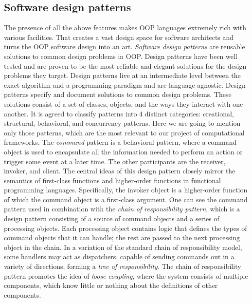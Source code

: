 \subsection{Software design patterns}
\label{background_design}
\quad The presence of all the above features makes OOP languages extremely rich with various facilities. That creates a vast design space for software architects and turns the OOP software design into an art. \textit{Software design patterns} \cite{gang-of-four} are reusable solutions to common design problems in OOP. Design patterns have been well tested and are proven to be the most reliable and elegant solutions for the design problems they target.\newline\null
\quad Design patterns live at an intermediate level between the exact algorithm and a programming paradigm and are language agnostic. Design patterns specify and document solutions to common design problems. These solutions consist of a set of classes, objects, and the ways they interact with one another. It is agreed to classify patterns into 4 distinct categories: creational, structural, behavioral, and concurrency patterns. Here we are going to mention only those patterns, which are the most relevant to our project of computational frameworks.\newline\null
\quad The \textit{command} pattern is a behavioral pattern, where a command object is used to encapsulate all the information needed to perform an action or trigger some event at a later time. The other participants are the receiver, invoker, and client. The central ideas of this design pattern closely mirror the semantics of first-class functions and higher-order functions in functional programming languages. Specifically, the invoker object is a higher-order function of which the command object is a first-class argument.\newline\null
\quad One can see the command pattern used in combination with the \textit{chain of responsibility pattern}, which is a design pattern consisting of a source of command objects and a series of processing objects. Each processing object contains logic that defines the types of command objects that it can handle; the rest are passed to the next processing object in the chain. In a variation of the standard chain of responsibility model, some handlers may act as dispatchers, capable of sending commands out in a variety of directions, forming a \textit{tree of responsibility}. The chain of responsibility pattern promotes the idea of \textit{loose coupling}, where the system consists of multiple components, which know little or nothing about the definitions of other components.\newline\null
